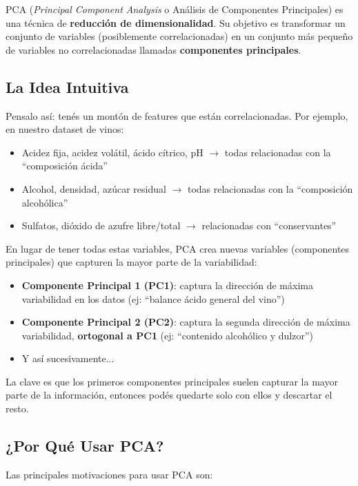 \documentclass[12pt]{article}
\begin{document}
PCA (\textit{Principal Component Analysis} o Análisis de Componentes Principales) es una técnica de \textbf{reducción de dimensionalidad}. Su objetivo es transformar un conjunto de variables (posiblemente correlacionadas) en un conjunto más pequeño de variables no correlacionadas llamadas \textbf{componentes principales}.

\subsection{La Idea Intuitiva}

Pensalo así: tenés un montón de features que están correlacionadas. Por ejemplo, en nuestro dataset de vinos:

\begin{itemize}
    \item Acidez fija, acidez volátil, ácido cítrico, pH $\rightarrow$ todas relacionadas con la ``composición ácida''
    \item Alcohol, densidad, azúcar residual $\rightarrow$ todas relacionadas con la ``composición alcohólica''
    \item Sulfatos, dióxido de azufre libre/total $\rightarrow$ relacionadas con ``conservantes''
\end{itemize}

En lugar de tener todas estas variables, PCA crea nuevas variables (componentes principales) que capturen la mayor parte de la variabilidad:

\begin{itemize}
    \item \textbf{Componente Principal 1 (PC1)}: captura la dirección de máxima variabilidad en los datos (ej: ``balance ácido general del vino'')
    \item \textbf{Componente Principal 2 (PC2)}: captura la segunda dirección de máxima variabilidad, \textbf{ortogonal a PC1} (ej: ``contenido alcohólico y dulzor'')
    \item Y así sucesivamente...
\end{itemize}

La clave es que los primeros componentes principales suelen capturar la mayor parte de la información, entonces podés quedarte solo con ellos y descartar el resto.

\subsection{¿Por Qué Usar PCA?}

Las principales motivaciones para usar PCA son:
\end{document}
